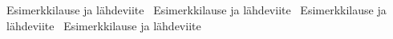 \documentclass[finnish]{tktltiki2}
\theoremstyle{definition}
\theoremstyle{remark}
\begin{document}
 





Esimerkkilause ja lähdeviite~\cite{Zhang:2011:ECL:2047594.2047666}
Esimerkkilause ja lähdeviite~\cite{Dhomne:2012:ITL:2382887.2382899}
Esimerkkilause ja lähdeviite~\cite{Augustine:2005:APM:1101779.1101781}
Esimerkkilause ja lähdeviite~\cite{Li:2006:MOS:1125170.1125182}






%

%
% 
%



\end{document}
